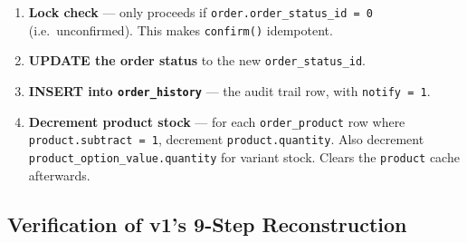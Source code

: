 \documentclass[11pt,a4paper]{article}
\begin{document}
\begin{enumerate}[leftmargin=1.6em,itemsep=2pt]
  \item \textbf{Lock check} --- only proceeds if
        \texttt{order.order\_status\_id = 0} (i.e.\ unconfirmed).
        This makes \texttt{confirm()} idempotent.
  \item \textbf{UPDATE the order status} to the new
        \texttt{order\_status\_id}.
  \item \textbf{INSERT into \texttt{order\_history}} --- the audit
        trail row, with \texttt{notify = 1}.
  \item \textbf{Decrement product stock} --- for each
        \texttt{order\_product} row where \texttt{product.subtract =
        1}, decrement \texttt{product.quantity}. Also decrement
        \texttt{product\_option\_value.quantity} for variant stock.
        Clears the \texttt{product} cache afterwards.
\end{enumerate}

\subsection{Verification of v1's 9-Step Reconstruction}
\end{document}
